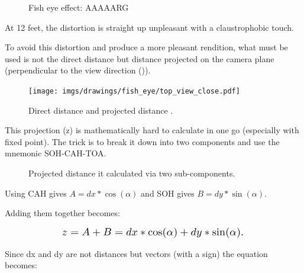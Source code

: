 \begin{minipage}{\textwidth}
 \begin{figure}[H]
\centering
 \caption{Fish eye effect: AAAAARG} \label{fig:mips}
 \end{figure}
 

\begin{minipage}{.4\textwidth}
At 12 feet, the distortion is straight up unpleasant with a claustrophobic touch.\\
\par
To avoid this distortion and produce a more pleasant rendition, what must be used is not the direct distance  but distance projected on the camera plane (perpendicular to the view direction ()).
 \end{minipage}
\begin{minipage}{.6\textwidth}
 \begin{figure}[H]
  \begin{flushright}
  \texttt{[image: imgs/drawings/fish\_eye/top\_view\_close.pdf]}
 \end{flushright}
\end{figure}
 \end{minipage}
\end{minipage}
\par



\begin{figure}[H]

 
\label{fig:Raycasting2}
 \caption{Direct distance  and projected distance .}
\end{figure}

This projection (z) is mathematically hard to calculate in one go (especially with fixed point). The trick is to break it down into two components and use the mnemonic SOH-CAH-TOA.\\


\begin{figure}[H]
\centering
 
 \caption{Projected distance  it calculated via two sub-components.}
\end{figure}
Using CAH gives $A = dx * \cos(\alpha)$ and SOH gives $B = dy * \sin(\alpha) $.\\
\par

Adding them together becomes:
\par
\begin{figure}[H]
  \centering
  \begin{equation*}
    \scalebox{1.3}{
$z = A + B = dx * \cos(\alpha) + dy * \sin(\alpha) $. 
 }
  \end{equation*}
\end{figure}
Since dx and dy are not distances but vectors (with a sign) the equation becomes: 


